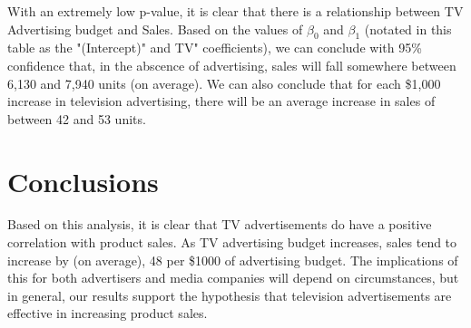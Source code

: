 \documentclass{article}
\begin{document}
With an extremely low p-value, it is clear that there is a relationship between TV Advertising budget and Sales. Based on the values of $\beta_0$ and $\beta_1$ (notated in this table as the "(Intercept)" and TV" coefficients), we can conclude with 95\% confidence that, in the abscence of advertising, sales will fall somewhere between 6,130 and 7,940 units (on average). We can also conclude that for each \$1,000 increase in television advertising, there will be an average increase in sales of between 42 and 53 units.

\section{Conclusions}

Based on this analysis, it is clear that TV advertisements do have a positive correlation with product sales. As TV advertising budget increases, sales tend to increase by (on average), 48 per \$1000 of advertising budget. The implications of this for both advertisers and media companies will depend on circumstances, but in general, our results support the hypothesis that television advertisements are effective in increasing product sales.
\end{document}
